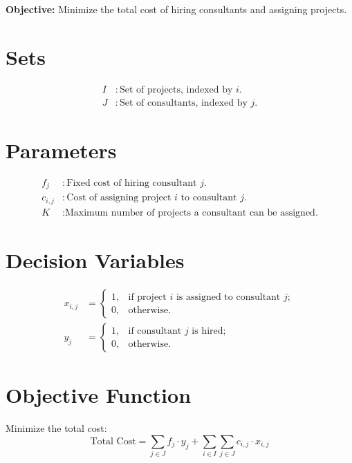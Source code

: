 \documentclass{article}
\begin{document}
\textbf{Objective:} Minimize the total cost of hiring consultants and assigning projects.

\section*{Sets}
\begin{align*}
    I & : \text{Set of projects, indexed by } i. \\
    J & : \text{Set of consultants, indexed by } j.
\end{align*}

\section*{Parameters}
\begin{align*}
    f_j & : \text{Fixed cost of hiring consultant } j. \\
    c_{i,j} & : \text{Cost of assigning project } i \text{ to consultant } j. \\
    K & : \text{Maximum number of projects a consultant can be assigned.}
\end{align*}

\section*{Decision Variables}
\begin{align*}
    x_{i,j} & = 
    \begin{cases} 
    1, & \text{if project } i \text{ is assigned to consultant } j; \\
    0, & \text{otherwise.}
    \end{cases} \\
    y_j & = 
    \begin{cases} 
    1, & \text{if consultant } j \text{ is hired;} \\
    0, & \text{otherwise.}
    \end{cases}
\end{align*}

\section*{Objective Function}
Minimize the total cost:
\begin{equation}
    \text{Total Cost} = \sum_{j \in J} f_j \cdot y_j + \sum_{i \in I} \sum_{j \in J} c_{i,j} \cdot x_{i,j}
\end{equation}
\end{document}
